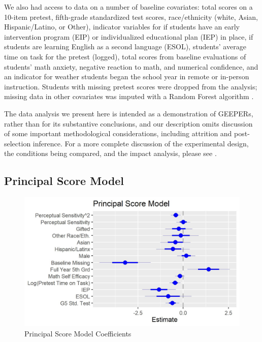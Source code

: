 \documentclass[11pt]{article} %
\begin{document}
We also had access to data on a number of baseline covariates: total scores on a 10-item pretest, fifth-grade standardized test scores, race/ethnicity (white, Asian, Hispanic/Latino, or Other), indicator variables for if students have an early intervention program (EIP) or individualized educational plan (IEP) in place, if students are learning English as a second language (ESOL), students' average time on task for the pretest (logged), total scores from baseline evaluations of students' math anxiety, negative reaction to math, and numerical confidence, and an indicator for weather students began the school year in remote or in-person instruction.
Students with missing pretest scores were dropped from the analysis; missing data in other covariates was imputed with a Random Forest algorithm \citep{missForest}.

The data analysis we present here is intended as a demonstration of GEEPERs, rather than for its substantive conclusions, and our description omits discussion of some important methodological considerations, including attrition and post-selection inference. For a more complete discussion of the experimental design, the conditions being compared, and the impact analysis, please see \citet{impactPaper}.

\subsection{Principal Score Model}\label{sec:psMod}

\begin{figure}
  \centering
  \includegraphics{../figure/psModCoef.jpg}
  \caption{Principal Score Model Coefficients}
  \label{fig:psMod}
\end{figure}
\end{document}
